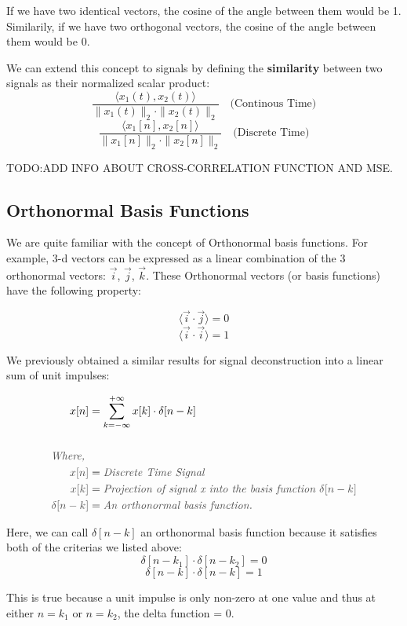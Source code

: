 \documentclass[letterpaper,12pt]{article}
\newcommand{\annot}[1]{\textcolor{darkgray}{\textit{#1}}}
\begin{document}
If we have two identical vectors, the cosine of the angle between them would be 1. Similarily, if we have two orthogonal vectors, the cosine of the angle between them would be 0.

We can extend this concept to signals by defining the \textbf{similarity} between two signals as their normalized scalar product:
\[\frac{\langle x_1(t), x_2(t) \rangle}{\| x_1(t) \|_2 \cdot \| x_2(t) \|_2}\quad \text{(Continous Time)}\]
\[\frac{\langle x_1[n], x_2[n] \rangle}{\| x_1[n] \|_2 \cdot \| x_2[n] \|_2}\quad \text{(Discrete Time)}\]

TODO:ADD INFO ABOUT CROSS-CORRELATION FUNCTION AND MSE.

\subsection*{Orthonormal Basis Functions}
We are quite familiar with the concept of Orthonormal basis functions. For example, 3-d vectors can be expressed as a linear combination of the 3 orthonormal vectors: $\Vec{i}$, $\Vec{j}$, $\Vec{k}$.
These Orthonormal vectors (or basis functions) have the following property:

\[\langle \Vec{i} \cdot \Vec{j} \rangle = 0\]
\[\langle \Vec{i} \cdot \Vec{i} \rangle = 1\]

We previously obtained a similar results for signal deconstruction into a linear sum of unit impulses:

\begin{align*}
    x[n]                  & = \sum_{k=-\infty}^{+\infty} x[k] \cdot \delta [n-k]                   \\ \\
    \annot{Where, }                                                                                \\
    \annot{$x[n]$}        & = \annot{Discrete Time Signal}                                         \\
    \annot{$x[k]$}        & = \annot{Projection of signal x into the basis function $\delta[n-k]$} \\
    \annot{$\delta[n-k]$} & = \annot{An orthonormal basis function.}
\end{align*}

Here, we can call $\delta[n-k]$ an orthonormal basis function because it satisfies both of the criterias we listed above:
\[\delta[n-k_{1}] \cdot \delta[n-k_{2}] = 0\]
\[\delta[n-k] \cdot \delta[n-k] = 1\]

This is true because a unit impulse is only non-zero at one value and thus at either $n=k_{1}$ or $n=k_{2}$, the delta function = 0.
\end{document}
